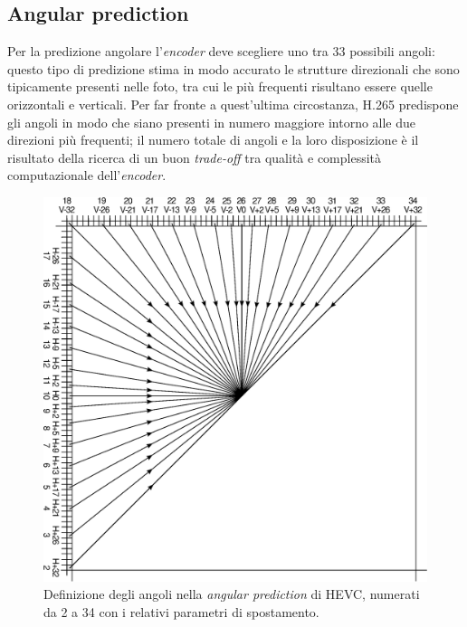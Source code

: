 \subsection{Angular prediction}
Per la predizione angolare l'\textit{encoder} deve scegliere uno tra 33 
possibili angoli: questo tipo di predizione stima in modo accurato le strutture 
direzionali che sono tipicamente presenti nelle foto, tra cui le più frequenti 
risultano essere quelle orizzontali e verticali.
Per far fronte a quest'ultima circostanza, H.265 predispone gli angoli in modo 
che siano presenti in numero maggiore intorno alle due direzioni più frequenti;
 il numero totale di angoli e la loro disposizione è il risultato della ricerca 
di un buon \emph{trade-off} tra qualità e complessità computazionale 
dell'\textit{encoder}.

\begin{figure}[H]
  \centering
  \captionsetup{justification=raggedright}
  \includegraphics[scale=0.6]{Figures/Angular_prediction}
  \caption[Definizione degli angoli nella \emph{angular prediction}]
	  {Definizione degli angoli nella \emph{angular prediction} di HEVC,
           numerati da 2 a 34 con i relativi parametri di spostamento.}
\end{figure}

